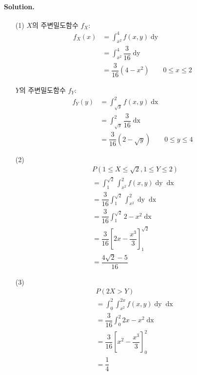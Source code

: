 \paragraph{Solution.}
\begin{itemize}
  \item [(1)] $X$의 주변밀도함수 $f_X$:
\begin{align*}
	f_X\left(x\right) &= \int_{x^2}^4 f\left(x, y\right) \mathop{dy} \\
	&= \int_{x^2}^4 \dfrac{3}{16} \mathop{dy}\\
	&= \dfrac{3}{16}\left(4 - x^2\right) \qquad 0\leq x\leq 2
\end{align*}

$Y$의 주변밀도함수 $f_Y$:
\begin{align*}
	f_Y\left(y\right) &= \int_{\sqrt{y}}^2 f\left(x, y\right) \mathop{dx} \\
	&= \int_{\sqrt{y}}^2 \dfrac{3}{16} \mathop{dx}\\
	&= \dfrac{3}{16}\left(2 - \sqrt{y}\right) \qquad 0\leq y\leq 4
\end{align*}

  \item [(2)]
\begin{align*}
	& P\left(1\leq X\leq \sqrt{2}, 1\leq Y\leq 2\right) \\
	&= \int_1^{\sqrt{2}} \int_{x^2}^2 f\left(x, y\right) \mathop{dy} \mathop{dx}\\
	&= \dfrac{3}{16} \int_1^{\sqrt{2}} \int_{x^2}^2 \mathop{dy} \mathop{dx}\\
	&= \dfrac{3}{16} \int_1^{\sqrt{2}} 2 - x^2 \mathop{dx}\\
	&= \dfrac{3}{16} \left[ 2x - \dfrac{x^3}{3} \right]_1^{\sqrt{2}}\\
	&= \dfrac{4\sqrt{2}-5}{16}
\end{align*}

  \item [(3)]
\begin{align*}
	&P\left(2X > Y\right) \\
	&= \int_0^2 \int_{x^2}^{2x} f\left(x, y\right) \mathop{dy} \mathop{dx}\\
	&= \dfrac{3}{16} \int_0^2 2x - x^2 \mathop{dx}\\
	&= \dfrac{3}{16} \left[ x^2 - \dfrac{x^3}{3} \right]_0^2\\
	&= \dfrac{1}{4}
\end{align*}
\end{itemize}

